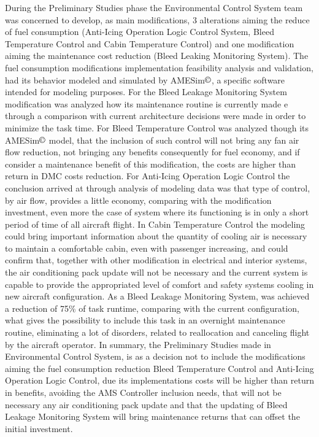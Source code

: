 During the Preliminary Studies phase the Environmental Control System team was concerned to develop, as main modifications, 3 alterations aiming the reduce of fuel consumption (Anti-Icing Operation Logic Control System, Bleed Temperature Control and Cabin Temperature Control) and one modification aiming the maintenance cost reduction (Bleed Leaking Monitoring System).
The fuel consumption modifications implementation feasibility analysis and validation, had its behavior modeled and simulated by AMESim$\copyright$, a specific software intended for modeling purposes. For the Bleed Leakage Monitoring System modification was analyzed how its maintenance routine is currently made e through a comparison with current architecture decisions were made in order to minimize the task time. 
For Bleed Temperature Control was analyzed though its AMESim$\copyright$ model, that the inclusion of such control will not bring any fan air flow reduction, not bringing any benefits consequently for fuel economy, and if consider a maintenance benefit of this modification, the costs are higher than return in DMC costs reduction.
For Anti-Icing Operation Logic Control the conclusion arrived at through analysis of modeling data was that type of control, by air flow, provides a little economy, comparing with the modification investment, even more the case of system where its functioning is in only a short period of time of all aircraft flight.
In Cabin Temperature Control the modeling could bring important information about the quantity of  cooling air is necessary to maintain a comfortable cabin, even with passenger increasing, and could confirm that, together with other modification in electrical and interior systems, the air conditioning pack update will not be necessary and the current system is capable to provide the appropriated level of comfort and safety systems cooling in new aircraft configuration. 
As a Bleed Leakage Monitoring System, was achieved a reduction of 75\% of task runtime, comparing with the current configuration, what gives the possibility to include this task in an overnight maintenance routine, eliminating a lot of disorders, related to reallocation and canceling flight by the aircraft operator. 
In summary, the Preliminary Studies made in Environmental Control System, is as a decision not to include the modifications aiming the fuel consumption reduction Bleed Temperature Control and Anti-Icing Operation Logic Control, due its implementations costs will be higher than return in benefits, avoiding the AMS Controller inclusion needs,  that will not be necessary any air conditioning pack update and that the updating of Bleed Leakage Monitoring System will bring maintenance returns that can offset the initial investment.
